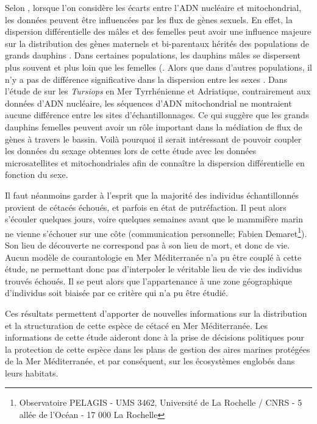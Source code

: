 \documentclass[a4paper,12pt,twoside]{article}\usepackage[]{graphicx}\usepackage[]{color}
\begin{document}
\begin {bibunit} [newbst]
{Selon \citet{gaspari2015population}, lorsque l'on considère les écarts entre l'ADN nucléaire et mitochondrial, les données peuvent être influencées par les flux de gènes sexuels. En effet, la dispersion différentielle des mâles et des femelles peut avoir une influence majeure sur la distribution des gènes maternels et bi-parentaux hérités des populations de grands dauphins \citep{hoelzel1998genetic}. Dans certaines populations, les dauphins mâles se dispersent plus souvent et plus loin que les femelles (\citep{krutzen2004population, moller2004genetic}. Alors que dans d'autres populations, il n'y a pas de différence significative dans la dispersion entre les sexes \citep{natoli2005habitat}. Dans l'étude de \citet{gaspari2015population} sur les \emph{Tursiops} en Mer Tyrrhénienne et Adriatique, contrairement aux données d'ADN nucléaire, les séquences d'ADN mitochondrial ne montraient aucune différence entre les sites d'échantillonnages. Ce qui suggère que les grands dauphins femelles peuvent avoir un rôle important dans la médiation de flux de gènes à travers le bassin. Voilà pourquoi il serait intéressant de pouvoir coupler les données du sexage obtenues lors de cette étude avec les données microsatellites et mitochondriales afin de connaître la dispersion différentielle en fonction du sexe.

Il faut néanmoins garder à l'esprit que la majorité des individus échantillonnés provient de cétacés échoués, et parfois en état de putréfaction. Il peut alors s'écouler quelques jours, voire quelques semaines avant que le mammifère marin ne vienne s'échouer sur une côte (communication personnelle; Fabien Demaret\footnote{Observatoire PELAGIS - UMS 3462, Université de La Rochelle / CNRS - 5 allée de l’Océan - 17 000 La Rochelle}). Son lieu de découverte ne correspond pas à son lieu de mort, et donc de vie. Aucun modèle de courantologie en Mer Méditerranée n'a pu être couplé à cette étude, ne permettant donc pas d'interpoler le véritable lieu de vie des individus trouvés échoués. Il se peut alors que l'appartenance à une zone géographique d'individus soit biaisée par ce critère qui n'a pu être étudié.

Ces résultats permettent d'apporter de nouvelles informations sur la distribution et la structuration de cette espèce de cétacé en Mer Méditerranée. Les informations de cette étude aideront donc à la prise de décisions politiques pour la protection de cette espèce dans les plans de gestion des aires marines protégées de la Mer Méditerranée, et par conséquent, sur les écosystèmes englobés dans leurs habitats.


}
\end{bibunit}
\end{document}
